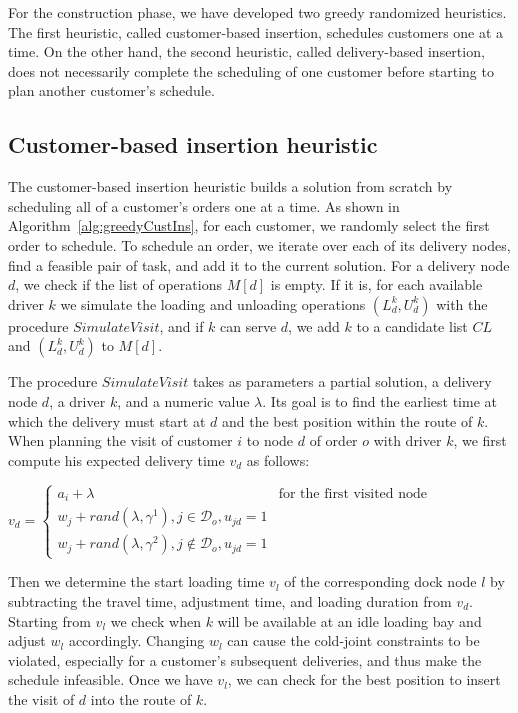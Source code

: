 \documentclass{article}
\begin{document}
For the construction phase, we have developed two greedy randomized heuristics. The first heuristic, called customer-based insertion, schedules customers one at a time. On the other hand, the second heuristic, called delivery-based insertion, does not necessarily complete the scheduling of one customer before starting to plan another customer's schedule.

\subsection{Customer-based insertion heuristic}

The customer-based insertion heuristic builds a solution from scratch by scheduling all of a customer's orders one at a time. As shown in Algorithm~\ref{alg:greedyCustIns}, for each customer, we randomly select the first order to schedule. To schedule an order, we iterate over each of its delivery nodes, find a feasible pair of task, and add it to the current solution. For a delivery node $d$, we check if the list of operations $M[d]$ is empty. If it is, for each available driver $k$ we simulate the loading and unloading operations $(L^k_d,U^k_d)$ with the procedure $SimulateVisit$, and if $k$ can serve $d$, we add $k$ to a candidate list $CL$ and $(L^k_d,U^k_d)$ to $M[d]$.

The procedure $SimulateVisit$ takes as parameters a partial solution, a delivery node $d$, a driver $k$, and a numeric value $\lambda$. Its goal is to find the earliest time at which the delivery must start at $d$ and the best position within the route of $k$. When planning the visit of customer $i$ to node $d$ of order $o$ with driver $k$, we first compute his expected delivery time $v_d$ as follows:

$ v_d = \left\{
    \begin{array}{rl}
        a_i + \lambda                                                   & \text{for the first visited node} \\
        w_j + rand(\lambda, \gamma^1), j \in \mathcal{D}_o,  u_{jd}=1   &                                   \\
        w_j + rand(\lambda, \gamma^2), j \notin \mathcal{D}_o, u_{jd}=1 &
    \end{array}
    \right.$

Then we determine the start loading time $v_l$ of the corresponding dock node $l$ by subtracting the travel time, adjustment time, and loading duration from $v_d$. Starting from $v_l$ we check when $k$ will be available at an idle loading bay and adjust $w_l$ accordingly. Changing $w_l$ can cause the cold-joint constraints to be violated, especially for a customer's subsequent deliveries, and thus make the schedule infeasible. Once we have $v_l$, we can check for the best position to insert the visit of $d$ into the route of $k$.
\end{document}
